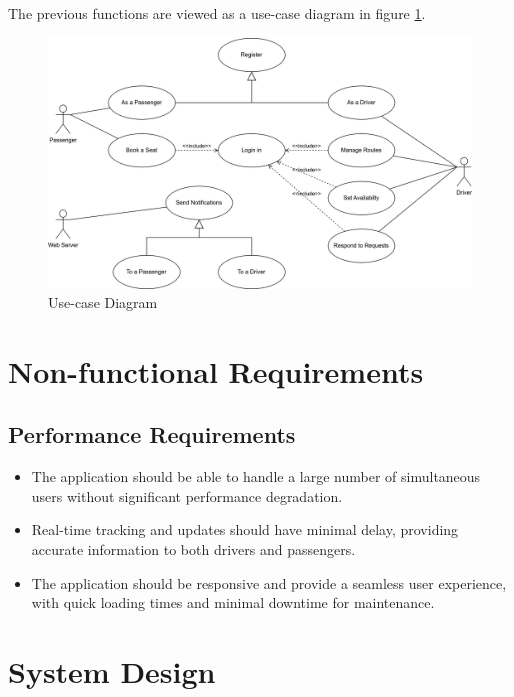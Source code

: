 \documentclass{BusMateSRS}
\begin{document}
The previous functions are viewed as a use-case diagram in 
figure \ref{fig:usecase-diagram}.

\begin{figure}[h!]
  \begin{center}
    \includegraphics[width=\columnwidth]{drawings/usecase-diagram.drawio.png}
  \end{center}
  \caption{Use-case Diagram}
  \label{fig:usecase-diagram}
\end{figure}


\section{Non-functional Requirements}
\subsection{Performance Requirements}
\begin{itemize}
  \item The application should be able to handle a large number of simultaneous 
    users without significant performance degradation.
  \item Real-time tracking and updates should have minimal delay, 
    providing accurate information to both drivers and passengers.
  \item The application should be responsive and provide a seamless user 
    experience, with quick loading times and minimal downtime for maintenance.
\end{itemize}


\section{System Design}
\end{document}
